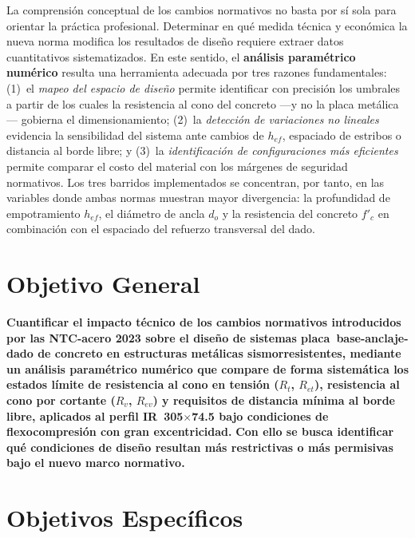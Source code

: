 La comprensión conceptual de los cambios normativos no basta por sí sola para orientar la
práctica profesional. Determinar en qué medida técnica y económica la nueva norma modifica los
resultados de diseño requiere extraer datos cuantitativos sistematizados. En este sentido, el
\textbf{análisis paramétrico numérico} resulta una herramienta adecuada por tres razones
fundamentales: (1)~el \textit{mapeo del espacio de diseño} permite identificar con precisión los
umbrales a partir de los cuales la resistencia al cono del concreto ---y no la placa metálica---
gobierna el dimensionamiento; (2)~la \textit{detección de variaciones no lineales} evidencia la
sensibilidad del sistema ante cambios de $h_{ef}$, espaciado de estribos o distancia al borde
libre; y (3)~la \textit{identificación de configuraciones más eficientes} permite comparar el
costo del material con los márgenes de seguridad normativos. Los tres barridos
implementados se concentran, por tanto, en las variables donde ambas normas muestran mayor
divergencia: la profundidad de empotramiento $h_{ef}$, el diámetro de ancla $d_o$ y la
resistencia del concreto $f'_c$ en combinación con el espaciado del refuerzo transversal del
dado.

\section{Objetivo General}

\textbf{Cuantificar el impacto técnico de los cambios normativos introducidos por las NTC-acero
2023 sobre el diseño de sistemas placa~base-anclaje-dado de concreto en estructuras metálicas
sismorresistentes, mediante un análisis paramétrico numérico que compare de forma sistemática los
estados límite de resistencia al cono en tensión ($R_t$, $R_{et}$), resistencia al cono por
cortante ($R_v$, $R_{ev}$) y requisitos de distancia mínima al borde libre, aplicados al perfil
IR~305$\times$74.5 bajo condiciones de flexocompresión con gran excentricidad.} \textbf{Con ello
se busca identificar qué condiciones de diseño resultan más restrictivas o más permisivas bajo el
nuevo marco normativo.}

\section{Objetivos Específicos}

